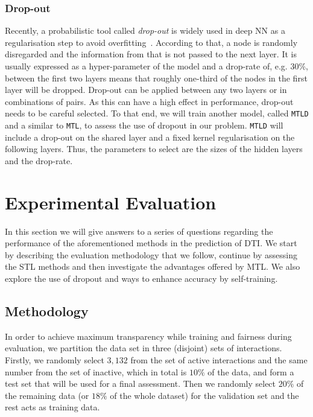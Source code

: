 \documentclass[10pt]{article}
\begin{document}
\subsubsection{Drop-out}
Recently, a probabilistic tool called \textit{drop-out} is widely used in deep NN as a regularisation step to avoid overfitting~\cite{ramsundar2015massively,lecun2015deep}. According to that, a node is randomly disregarded and the information from that is not passed to the next layer. It is usually expressed as a hyper-parameter of the model and a drop-rate of, e.g. $30\%$, between the first two layers means that roughly one-third of the nodes in the first layer will be dropped. Drop-out can be applied between any two layers or in combinations of pairs. As this can have a high effect in performance, drop-out needs to be careful selected. To that end, we will train another model, called \texttt{MTLD} and a similar to \texttt{MTL}, to assess the use of dropout in our problem.  \texttt{MTLD} will include a drop-out on the shared layer and a fixed kernel regularisation on the following layers. Thus, the parameters to select are the sizes of the hidden layers and the drop-rate.

\clearpage
\section{Experimental Evaluation}
\label{s:experiments}

In this section we will give answers to a series of questions regarding the performance of the aforementioned methods in the prediction of DTI. We start by describing the evaluation methodology that we follow, continue by assessing the STL methods and then investigate the advantages offered by MTL. We also explore the use of dropout and ways to enhance accuracy by self-training.

\subsection{Methodology}
\label{SS:methodology}
  
In order to achieve maximum transparency while training and fairness during evaluation, we partition the data set in three (disjoint) sets of interactions. Firstly, we randomly select  $3,132$ from the set of active interactions and the same number from the set of inactive, which in total is $10\%$ of the data, and form a test set that will be used for a final assessment. Then we randomly select $20\%$ of the remaining data (or $18\%$ of the whole dataset) for the validation set and the rest acts as training data. 
 
\end{document}
